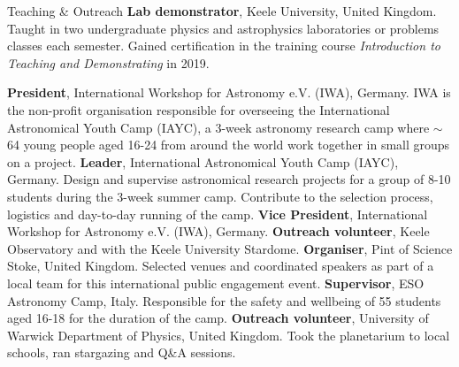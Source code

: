 \begin{rubric}{Teaching \& Outreach}
\entry*[2018 -- 2022]%
    \textbf{Lab demonstrator}, Keele University, United Kingdom. Taught in two undergraduate physics and astrophysics laboratories or problems classes each semester. Gained certification in the training course \emph{Introduction to Teaching and Demonstrating} in 2019.

\entry*[2023 -- ~~~~~\,\,\,~~~]%
    \textbf{President}, International Workshop for Astronomy e.V. (IWA), Germany. IWA is the non-profit organisation responsible for overseeing the International Astronomical Youth Camp (IAYC), a 3-week astronomy research camp where $\sim$64 young people aged 16-24 from around the world work together in small groups on a project. 
\entry*[2017 -- ~~~~~\,\,\,~~~]%
    \textbf{Leader}, International Astronomical Youth Camp (IAYC), Germany. Design and supervise astronomical research projects for a group of 8-10 students during the 3-week summer camp. Contribute to the selection process, logistics and day-to-day running of the camp.
\entry*[2021 -- 2023]%
    \textbf{Vice President}, International Workshop for Astronomy e.V. (IWA), Germany.
\entry*[2019 -- 2022]%
    \textbf{Outreach volunteer}, Keele Observatory and with the Keele University Stardome. 
\entry*[2019 -- 2020]%
    \textbf{Organiser}, Pint of Science Stoke, United Kingdom. Selected venues and coordinated speakers as part of a local team for this international public engagement event.
\entry*[2017 -- 2019]%
    \textbf{Supervisor}, ESO Astronomy Camp, Italy. Responsible for the safety and wellbeing of 55 students aged 16-18 for the duration of the camp.%
\entry*[2017 -- 2018]%
    \textbf{Outreach volunteer}, University of Warwick Department of Physics, United Kingdom. Took the planetarium to local schools, ran stargazing and Q\&A sessions.

    
\end{rubric}
